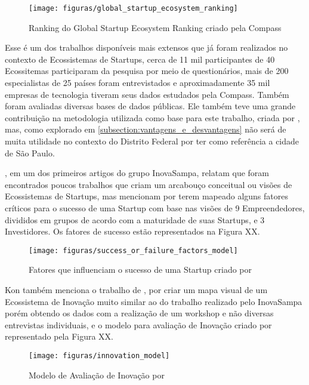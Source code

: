 \begin{figure}[!htb]
\centering
\texttt{[image: figuras/global\_startup\_ecosystem\_ranking]}
\caption{Ranking do Global Startup Ecosystem Ranking criado pela Compass}
\label{figure:global_startup_ecosystem_ranking}
\end{figure}

Esse é um dos trabalhos disponíveis mais extensos que já foram realizados no contexto de Ecossistemas de Startups, cerca de 11 mil participantes de 40 Ecossitemas participaram da pesquisa por meio de questionários, mais de 200 especialistas de 25 países foram entrevistados e aproximadamente 35 mil empresas de tecnologia tiveram seus dados estudados pela Compass. Também foram avaliadas diversas bases de dados públicas. Ele também teve uma grande contribuição na metodologia utilizada como base para este trabalho, criada por , mas, como explorado em \ref{subsection:vantagens_e_desvantagens} não será de muita utilidade no contexto do Distrito Federal por ter como referência a cidade de São Paulo.

, em um dos primeiros artigos do grupo InovaSampa, relatam que foram encontrados poucos trabalhos que criam um arcabouço conceitual ou visões de Ecossistemas de Startups, mas mencionam  por terem mapeado alguns fatores críticos para o sucesso de uma Startup com base nas visões de 9 Empreendedores, divididos em grupos de acordo com a maturidade de suas Startups, e 3 Investidores. Os fatores de sucesso estão representados na Figura XX.

\begin{figure}[!htb]
\centering
\texttt{[image: figuras/success\_or\_failure\_factors\_model]}
\caption{Fatores que influenciam o sucesso de uma Startup criado por }
\label{figure:success_or_failure_factors_model}
\end{figure}

Kon também menciona o trabalho de , por criar um mapa visual de um Ecossistema de Inovação muito similar ao do trabalho realizado pelo InovaSampa porém obtendo os dados com a realização de um workshop e não diversas entrevistas individuais, e o modelo para avaliação de Inovação criado por  representado pela Figura XX. 

\begin{figure}[!htb]
\centering
\texttt{[image: figuras/innovation\_model]}
\caption{Modelo de Avaliação de Inovação por }
\label{figure:innovation_model}
\end{figure}

